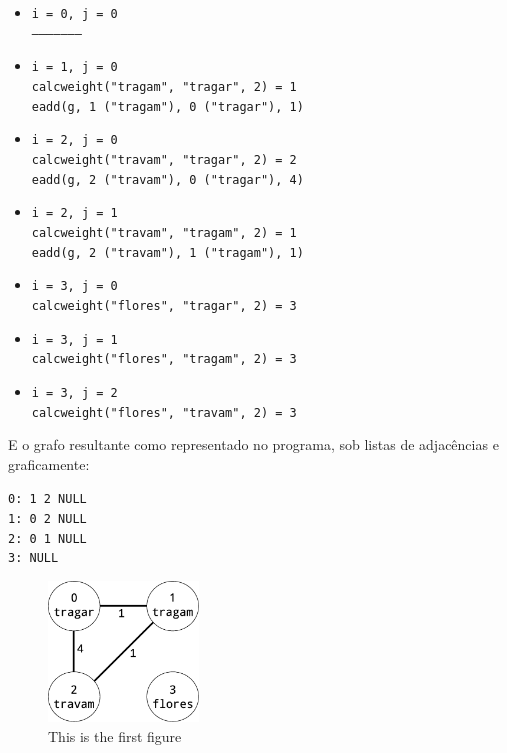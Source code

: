 \documentclass[a4paper, 18pt]{article}
\begin{document}
	\begin{itemize}
		\item
			\texttt{i = 0, j = 0} \\
			\texttt{---------------------}
		\item
			\texttt{i = 1, j = 0} \\
			\texttt{calc\textunderscore weight("tragam", "tragar", 2) = 1} \\
			\texttt{e\textunderscore add(g, 1 ("tragam"), 0 ("tragar"), 1)}
		\item
			\texttt{i = 2, j = 0} \\
			\texttt{calc\textunderscore weight("travam", "tragar", 2) = 2} \\
			\texttt{e\textunderscore add(g, 2 ("travam"), 0 ("tragar"), 4)}
		\item
			\texttt{i = 2, j = 1} \\
			\texttt{calc\textunderscore weight("travam", "tragam", 2) = 1} \\
			\texttt{e\textunderscore add(g, 2 ("travam"), 1 ("tragam"), 1)}
		\item
			\texttt{i = 3, j = 0} \\
			\texttt{calc\textunderscore weight("flores", "tragar", 2) = 3}
		\item
			\texttt{i = 3, j = 1} \\
			\texttt{calc\textunderscore weight("flores", "tragam", 2) = 3}
		\item
			\texttt{i = 3, j = 2} \\
			\texttt{calc\textunderscore weight("flores", "travam", 2) = 3}
	\end{itemize}
	\par
	E o grafo resultante como representado no programa, sob listas de adjacências e graficamente: \\
	\begin{minipage}{\linewidth}
		\centering
		\begin{minipage}{0.45\linewidth}
		\begin{center}
			\texttt{0: 1 \textrightarrow{} 2 \textrightarrow{} NULL \\
					1: 0 \textrightarrow{} 2 \textrightarrow{} NULL \\
					2: 0 \textrightarrow{} 1 \textrightarrow{} NULL \\
					3: NULL}
		\end{center}
		\end{minipage}
		\hspace{0.05\linewidth}
		\begin{minipage}{0.45\linewidth}
			\begin{figure}[H]
				\centering
				\includegraphics[width=4cm]{graph}
				\caption{This is the first figure}
			\end{figure}
		\end{minipage}
	\end{minipage}
\end{document}
